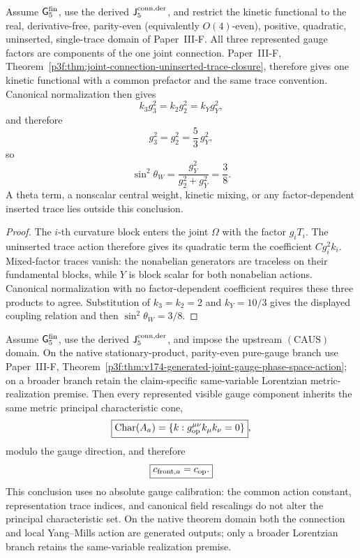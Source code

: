 \documentclass[12pt,a4paper]{article}
\begin{document}
\begin{corollary}
\label{p5:cor:conditional-common-kinetic-normalization}
Assume \(\mathsf G_5^{\rm fin}\), use the derived
\(\mathsf J_5^{\rm conn,der}\), and restrict the kinetic functional to the real,
derivative-free, parity-even (equivalently \(O(4)\)-even), positive,
quadratic, uninserted, single-trace domain of Paper~III-F.  All three
represented gauge factors are components of the one joint connection.
Paper~III-F,
Theorem~\ref{p3f:thm:joint-connection-uninserted-trace-closure}, therefore
gives one kinetic functional with a common prefactor and the same trace
convention.  Canonical
normalization then gives
\[
k_3g_3^2=k_2g_2^2=k_Yg_Y^2,
\]
and therefore
\[
g_3^2=g_2^2=\frac53\,g_Y^2,
\]
so
\begin{equation}
\label{p5:eq:part1-sin2}
\sin^2\theta_W=\frac{g_Y^2}{g_2^2+g_Y^2}=\frac38.
\end{equation}
A theta term, a nonscalar central weight, kinetic mixing, or any
factor-dependent inserted trace lies outside this conclusion.
\end{corollary}

\begin{proof}
The \(i\)-th curvature block enters the joint \(\Omega\) with the factor
\(g_iT_i\).  The uninserted trace action therefore gives its quadratic term
the coefficient \(C g_i^2 k_i\).  Mixed-factor traces vanish: the nonabelian
generators are traceless on their fundamental blocks, while \(Y\) is block
scalar for both nonabelian actions.  Canonical normalization with no
factor-dependent coefficient requires these three products to agree.
Substitution of \(k_3=k_2=2\) and \(k_Y=10/3\) gives the displayed coupling
relation and then \(\sin^2\theta_W=3/8\).
\end{proof}


\begin{corollary}
\label{p5:cor:conditional-gauge-cone-export}
Assume \(\mathsf G_5^{\rm fin}\), use the derived
\(\mathsf J_5^{\rm conn,der}\), and impose the upstream \((\mathrm{CAUS})\)
domain.  On the native stationary-product, parity-even pure-gauge branch use
Paper~III-F, Theorem~\ref{p3f:thm:v174-generated-joint-gauge-phase-space-action};
on a broader branch retain the claim-specific same-variable Lorentzian
metric-realization premise.  Then every represented visible gauge component
inherits the same
metric principal characteristic cone,
\[
 \boxed{\operatorname{Char}(A_a)=\{k:g_{\rm op}^{\mu\nu}k_\mu k_\nu=0\}},
\]
modulo the gauge direction, and therefore
\[
 \boxed{c_{{\rm front},a}=c_{\rm op}.}
\]
This conclusion uses no absolute gauge calibration: the common action constant,
representation trace indices, and canonical field rescalings do not alter the
principal characteristic set.  On the native theorem domain both the
connection and local Yang--Mills action are generated outputs; only a broader
Lorentzian branch retains the same-variable realization premise.
\end{corollary}
\end{document}
